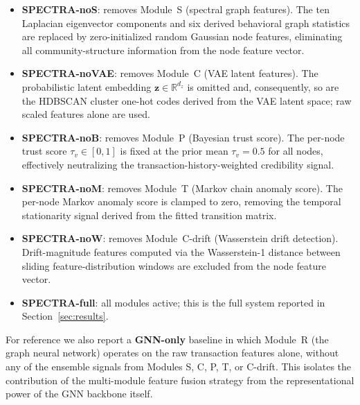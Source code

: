 \begin{itemize}[leftmargin=*, itemsep=2pt]

  \item \textbf{SPECTRA-noS}: removes Module~S (spectral graph features).
    The ten Laplacian eigenvector components and six derived behavioral
    graph statistics are replaced by zero-initialized random Gaussian
    node features, eliminating all community-structure information from
    the node feature vector.

  \item \textbf{SPECTRA-noVAE}: removes Module~C (VAE latent features).
    The probabilistic latent embedding $\mathbf{z} \in \mathbb{R}^{d_z}$
    is omitted and, consequently, so are the HDBSCAN cluster one-hot codes
    derived from the VAE latent space; raw scaled features alone are used.

  \item \textbf{SPECTRA-noB}: removes Module~P (Bayesian trust score).
    The per-node trust score $\tau_v \in [0,1]$ is fixed at the prior mean
    $\tau_v = 0.5$ for all nodes, effectively neutralizing the
    transaction-history-weighted credibility signal.

  \item \textbf{SPECTRA-noM}: removes Module~T (Markov chain anomaly score).
    The per-node Markov anomaly score is clamped to zero, removing the
    temporal stationarity signal derived from the fitted transition matrix.

  \item \textbf{SPECTRA-noW}: removes Module~C-drift (Wasserstein drift
    detection).  Drift-magnitude features computed via the Wasserstein-1
    distance between sliding feature-distribution windows are excluded from
    the node feature vector.

  \item \textbf{SPECTRA-full}: all modules active; this is the full system
    reported in Section~\ref{sec:results}.

\end{itemize}

For reference we also report a \textbf{GNN-only} baseline in which Module~R
(the graph neural network) operates on the raw transaction features alone,
without any of the ensemble signals from Modules S, C, P, T, or C-drift.
This isolates the contribution of the multi-module feature fusion strategy
from the representational power of the GNN backbone itself.


